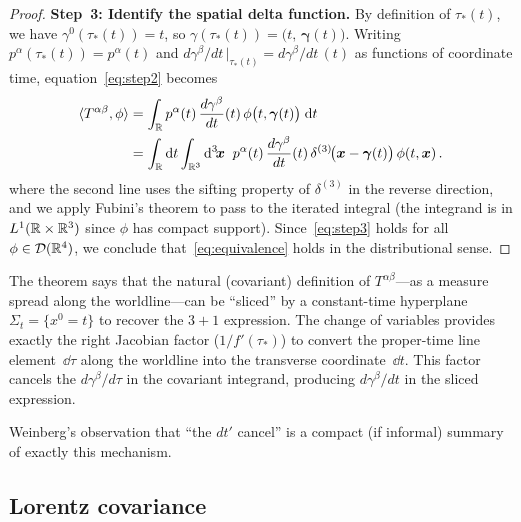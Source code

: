 \begin{proof}
  \medskip\noindent
  \textbf{Step~3: Identify the spatial delta function.}\;
  By definition of $\tau_\ast(t)$, we have
  $\gamma^0(\tau_\ast(t)) = t$, so
  $\gamma(\tau_\ast(t)) = \bigl(t,\,\boldsymbol{\gamma}(t)\bigr)$.
  Writing $p^\alpha(\tau_\ast(t)) = p^\alpha(t)$ and
  $d\gamma^\beta/dt\,\big|_{\tau_\ast(t)} = d\gamma^\beta/dt\,(t)$
  as functions of coordinate time, equation~\eqref{eq:step2}
  becomes
  \begin{align}
    \langle T^{\alpha\beta},\phi\rangle
      &= \int_{\mathbb{R}} p^\alpha(t)\,
         \frac{d\gamma^\beta}{dt}(t)\,
         \phi\bigl(t,\boldsymbol{\gamma}(t)\bigr)\;\mathrm{d} t
         \notag\\
      &= \int_{\mathbb{R}}\mathrm{d} t\int_{\mathbb{R}^{3}}\mathrm{d}^3\!\boldsymbol{x}\;\;
         p^\alpha(t)\,\frac{d\gamma^\beta}{dt}(t)\,
         \delta^{(3)}\!\bigl(\boldsymbol{x} - \boldsymbol{\gamma}(t)\bigr)\,
         \phi(t,\boldsymbol{x})\,.
         \label{eq:step3}
  \end{align}
  where the second line uses the sifting property of
  $\delta^{(3)}$ in the reverse direction, and we apply Fubini's
  theorem to pass to the iterated integral (the integrand is
  in $L^1(\mathbb{R}\times\mathbb{R}^{3})$ since $\phi$ has compact support).
  Since~\eqref{eq:step3} holds for all
  $\phi\in\mathcal{D}(\mathbb{R}^{4})$, we conclude
  that~\eqref{eq:equivalence} holds in the distributional sense.
\end{proof}

\begin{intuition}
  The theorem says that the natural (covariant) definition of
  $T^{\alpha\beta}$---as a measure spread along the worldline---can
  be ``sliced'' by a constant-time hyperplane $\Sigma_t = \{x^0 = t\}$
  to recover the $3{+}1$ expression.  The change of variables provides
  exactly the right Jacobian factor ($1/f'(\tau_\ast)$) to convert
  the proper-time line element~$\dd\tau$ along the worldline into
  the transverse coordinate~$\dd t$.  This factor cancels the
  $d\gamma^\beta/d\tau$ in the covariant integrand, producing
  $d\gamma^\beta/dt$ in the sliced expression.

  Weinberg's observation that ``the $dt'$ cancel'' is a compact
  (if informal) summary of exactly this mechanism.
\end{intuition}

\subsection{Lorentz covariance}\label{sec:lorentz-covariance-add}

